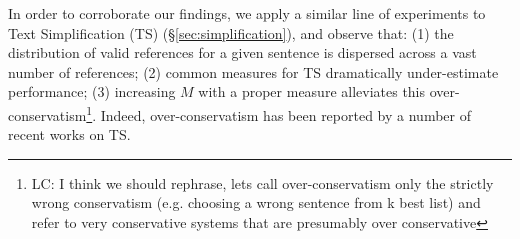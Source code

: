 \documentclass[a4paper, 11pt]{article}
\newcommand{\lc}[1]{\footnote{\color{blue}LC: #1}}
\begin{document}



In order to corroborate our findings, we apply a 
similar line of experiments to Text Simplification (TS) (\S\ref{sec:simplification}),
and observe that: (1) the distribution of valid references for a given sentence is dispersed across a vast number of references; 
(2) common measures for TS dramatically under-estimate performance; 
(3) increasing $M$ with a proper measure alleviates this over-conservatism\lc{I think we should rephrase, lets call over-conservatism only the strictly wrong conservatism (e.g. choosing a wrong sentence from k best list) and refer to very conservative systems that are presumably over conservative}.
Indeed, over-conservatism has been reported by a number of recent works on TS.
\end{document}
